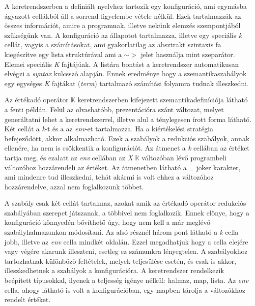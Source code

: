 

A keretrendszerben a definiált nyelvhez tartozik egy konfiguráció, ami egymásba ágyazott cellákból áll a sorrend figyelembe vétele nélkül. Ezek tartalmazzák az összes információt, amire a programnak, illetve nekünk elemzés szempontjából szükségünk van. A konfiguráció az állapotot tartalmazza, illetve egy speciális \textit{k} cellát, vagyis a számításokat, ami gyakorlatilag az absztrakt szintaxis fa kiegészítve egy lista struktúrával ami a $\sim>$ jelet használja mint szeparátor. Elemei speciális \textit{K} fajtájúak. A listára bontást a keretrendszer automatikusan elvégzi a \textit{syntax} kulcsszó alapján. Ennek eredménye hogy a szemantikaszabályok egy egységes \textit{K} fajtákat (\textit{term}) tartalmazó számítási folyamra tudnak illeszkedni.



Az értékadó operátor $\mathbb{K}$ keretrendszerben kifejezett szemantikadefiníciója látható a fenti példán. Felül az olvashatóbb, prezentációra szánt változat, melyet generáltatni lehet a keretrendszerrel, illetve alul a ténylegesen írott forma látható. Két cellát a \textit{k}-t és a az \textit{env}-et tartalmazza. Ha a kiértékelési stratégia befejeződött, akkor alkalmazható. Ezek a szabályok a redukciós szabályok, annak ellenére, ha nem is csökkentik a konfigurációt. Az átmenet a \textit{k} cellában az értéket tartja meg, és ezalatt az \textit{env} cellában az \textit{X} $\mathbb{K}$ változóban lévő programbeli változóhoz hozzárendeli az értéket. Az átmenetben látható a \textit{\_} joker karakter, ami mindenre tud illeszkedni, tehát akármi is volt ehhez a változóhoz hozzárendelve, azzal nem foglalkozunk többet.

A szabály csak két cellát tartalmaz, azokat amik az értékadó operátor redukciós szabályában szerepet játszanak, a többivel nem foglalkozik. Ennek előnye, hogy a konfiguráció könnyedén bővíthető úgy, hogy nem kell a már meglévő szabályhalmazunkon módosítani. Az alsó résznél három pont látható a \textit{k} cella jobb, illetve az \textit{env} cella mindkét oldalán. Ezzel megadhatjuk hogy a cella elejére vagy végére akarunk illeszteni, esetleg ez számunkra lényegtelen. A szabályokhoz tartozhatnak különböző feltételek, melyek teljesülése esetén, és csak is akkor, illeszkedhetnek a szabályok a konfigurációra. A keretrendszer rendelkezik beépített típusokkal, ilyenek a teljesség igénye nélkül: halmaz, map, lista. Az \textit{env} cella, ahogy látható is volt a konfigurációban, egy mapben tárolja a változókhoz rendelt értéket.

